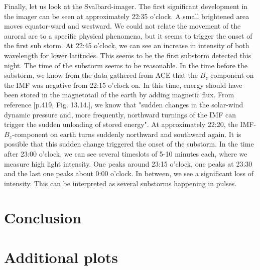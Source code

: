 \documentclass[10pt,a4paper]{article}
\begin{document}
Finally, let us look at the Svalbard-imager. The first significant development in the imager can be seen at approximately 22:35 o'clock. A small brightened area moves equator-ward and westward. We could not relate the movement of the auroral arc to a specific physical phenomena, but it seems to trigger the onset of the first sub storm. At 22:45 o'clock, we can see an increase in intensity of both wavelength for lower latitudes. This seems to be the first substorm detected this 
night. The time of the substorm seems to be reasonable. In the time before the substorm, we know from the data gathered from ACE that the $B_z$ component on the IMF was negative from 22:15 o'clock on. In this time, energy should have been stored in the magnetotail of the earth by adding magnetic flux. 
From reference \cite{Buch2}[p.419, Fig. 13.14.], we know that "sudden changes in the solar-wind dynamic pressure and, more frequently, northward turnings of the IMF can trigger the sudden unloading of stored energy". At approximately 22:20, the IMF-$B_z$-component on earth turns suddenly northward and southward again. It is possible that this sudden change triggered the onset of the substorm. In the time after 23:00 o'clock, we can see several timeslots of 5-10 minutes each, where we measure 
high light intensity. One peaks around 23:15 o'clock, one peaks at 23:30 and the last one peaks about 0:00 o'clock. In between, we see a significant loss of intensity. 
This can be interpreted as several substorms happening in pulses. 

\section{Conclusion}




\newpage
\section{Additional plots}
\end{document}

